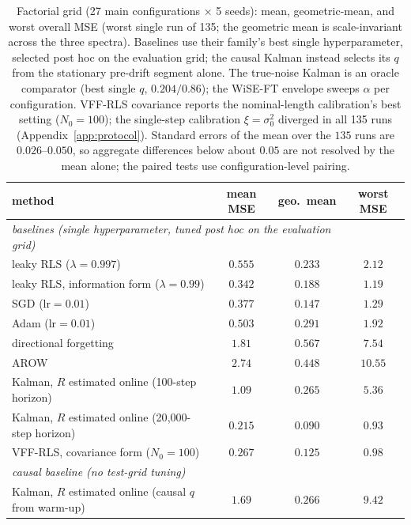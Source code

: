 \documentclass[10pt]{article}
\begin{document}
\begin{table}[t]
\centering
\footnotesize
\setlength{\tabcolsep}{4pt}
\renewcommand{\arraystretch}{0.92}
\caption{Factorial grid (27 main configurations $\times$ 5 seeds): mean, geometric-mean, and worst overall MSE (worst single run of 135; the geometric mean is scale-invariant across the three spectra).
Baselines use their family's best single hyperparameter, selected post hoc on the evaluation grid; the causal Kalman instead selects its $q$ from the stationary pre-drift segment alone.
The true-noise Kalman is an oracle comparator (best single $q$, $0.204/0.86$); the WiSE-FT envelope sweeps $\alpha$ per configuration.
VFF-RLS covariance reports the nominal-length calibration's best setting ($N_0 = 100$); the single-step calibration $\xi = \sigma_0^2$ diverged in all 135 runs (Appendix~\ref{app:protocol}).
Standard errors of the mean over the $135$ runs are $0.026$--$0.050$, so aggregate differences below about $0.05$ are not resolved by the mean alone; the paired tests use configuration-level pairing.}
\label{tab:grid}
\setlength{\tabcolsep}{3pt}
\begin{tabular}{lccc}
\toprule
method & mean MSE & geo.\ mean & worst MSE \\
\midrule
\multicolumn{3}{l}{\emph{baselines (single hyperparameter, tuned post hoc on the evaluation grid)}}\\
leaky RLS ($\lambda = 0.997$) & $0.555$ & $0.233$ & $2.12$ \\
leaky RLS, information form ($\lambda = 0.99$) & $0.342$ & $0.188$ & $1.19$ \\
SGD ($\mathrm{lr} = 0.01$) & $0.377$ & $0.147$ & $1.29$ \\
Adam ($\mathrm{lr} = 0.01$) & $0.503$ & $0.291$ & $1.92$ \\
directional forgetting & $1.81$ & $0.567$ & $7.54$ \\
AROW & $2.74$ & $0.448$ & $10.55$ \\
Kalman, $R$ estimated online (100-step horizon) & $1.09$ & $0.265$ & $5.36$ \\
Kalman, $R$ estimated online (20{,}000-step horizon) & $0.215$ & $0.090$ & $0.93$ \\
VFF-RLS, covariance form ($N_0 = 100$) \citep{fortescue1981} & $0.267$ & $0.125$ & $0.98$ \\
\multicolumn{3}{l}{\emph{causal baseline (no test-grid tuning)}}\\
Kalman, $R$ estimated online (causal $q$ from warm-up) & $1.69$ & $0.266$ & $9.42$ \\

\end{tabular}
\end{table}
\end{document}
